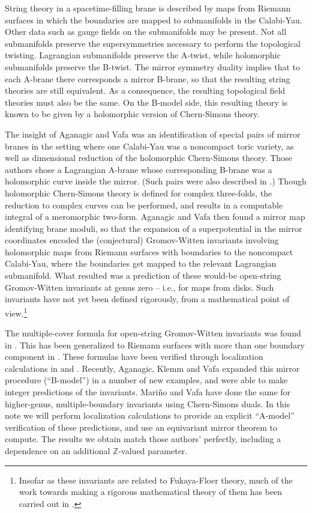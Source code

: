 \documentclass[a4paper,11pt]{article}
\newcommand{\Z}{\mathbb{Z}}
\begin{document}
String theory
in a spacetime-filling brane is described by maps from
Riemann surfaces in which the boundaries are mapped to
submanifolds in the Calabi-Yau.  Other data such as gauge
fields on the submanifolds may be present.
Not all submanifolds preserve the supersymmetries necessary
to perform the topological twisting.
Lagrangian submanifolds preserve the A-twist,
while holomorphic submanifolds preserve the B-twist.
The mirror symmetry duality implies that to each A-brane
there corresponds a mirror B-brane, so that the
resulting string theories are still equivalent.  As a consequence,
the resulting topological field theories must also be the
same.  On the B-model side, this resulting theory
is known \cite{BCOV} \cite{Witten} 
to be given by a holomorphic version of Chern-Simons theory.

The insight of Aganagic and Vafa
\cite{AV} was an identification of
special pairs of mirror branes in the setting where one
Calabi-Yau was a noncompact toric variety,
as well as dimensional
reduction of the holomorphic Chern-Simons theory.
Those authors chose a Lagrangian A-brane whose corresponding
B-brane was a holomorphic curve inside the mirror.
(Such pairs were also described in \cite{Hori}.)
Though holomorphic Chern-Simons theory is defined for complex
three-folds, the reduction to complex curves 
can be performed, and results in a computable integral of a meromorphic
two-form.  Aganagic and Vafa
then found a mirror map
identifying brane moduli, so that the expansion of a superpotential
in the mirror coordinates encoded the (conjectural) Gromov-Witten
invariants involving holomorphic
maps from Riemann surfaces with boundaries
to the noncompact Calabi-Yau, where
the boundaries get mapped
to the relevant Lagrangian submanifold.
What resulted was a prediction of these would-be
open-string Gromov-Witten
invariants at genus zero -- i.e., for maps from disks.
Such invariants have not yet been defined rigorously, from a
mathematical point of view.\footnote{Insofar as these
invariants are
related to Fukaya-Floer theory, much of the work towards making
a rigorous mathematical theory of them has been carried out in \cite{FOOO}.}

The multiple-cover formula for open-string
Gromov-Witten invariants
was found in \cite{OV}.  This has been generalized to
Riemann surfaces with more than one boundary component
in \cite{LMV}.
These formulas have been verified through
localization calculations in \cite{LS} and \cite{KL}.
Recently, Aganagic, Klemm and Vafa \cite{AKV}
expanded this mirror
procedure (``B-model'')
in a number of new examples, and were able to make
integer predictions of the invariants.  
Mari\~no and Vafa \cite{MV} have done the same for
higher-genus, multiple-boundary invariants
using Chern-Simons duals.
In this note we will
perform localization calculations to provide an
explicit ``A-model''
verification of these predictions,
and use an equivariant mirror theorem \cite{E} to compute.
The results we obtain match those
authors' perfectly, including a dependence on an
additional $\Z$-valued parameter.
\end{document}
